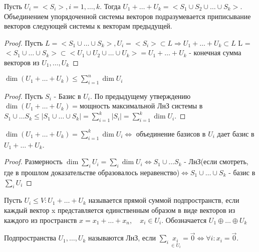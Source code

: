 \begin{proposition}
	Пусть \(U_i = <S_i>, i = 1,\ldots, k\). Тогда \(U_1+\ldots + U_k = <S_1\cup S_2\cup\ldots\cup S_k>\). Объединением упорядоченной системы векторов подразумевается приписывание векторов следующей системы к векторам предыдущей.
\end{proposition}
\begin{proof}
	Пусть \(L = <S_1\cup \ldots\cup S_k>, U_i = <S_i>\subset L\Longrightarrow U_1 + \ldots + U_k\subset L\) \newline
	L = \(<S_1\cup\ldots\cup S_k>\subset <U_1\cup U_2 \cup \ldots\cup U_k> = U_1 + \ldots + U_k\) - конечная сумма векторов из \(U_1, \ldots, U_k\)
\end{proof}
\begin{proposition}
	\(\dim(U_1 + \ldots + U_k) \le \sum_{i=1}^{n}\dim U_i\)
\end{proposition}
\begin{proof}
	Пусть \(S_i\) - Базис в \(U_i\). По предыдущему утверждению \(\dim (U_1 + \ldots + U_k) =\)мощность максимальной ЛнЗ системы в \(S_1\cup \ldots S_k\le |S_1\cup\ldots\cup S_k|= \sum_{i=1}^{k}|S_i| = \sum_{i=1}^{k}\dim U_i\).
\end{proof}
\begin{corollary}
	\(\dim(U_1+\ldots + U_k) = \sum_{i=1}^{k}\dim U_i\Longleftrightarrow\) объединение базисов в \(U_i\) дает базис в \(U_1+\ldots+U_k\).
\end{corollary}
\begin{proof}
	Размерность \(\dim \sum_{i}U_i = \sum_{i}\dim U_i\Longleftrightarrow S_1\cup\ldots S_k\) - ЛнЗ(если смотреть, где в прошлом доказательстве образовалось неравенство)$\Longleftrightarrow S_1\cup\ldots\cup S_k$ - базис в $\sum_{i}U_i$
\end{proof}
\begin{definition}
	Пусть \(U_i\le V: U_1+\ldots+U_k\) называется прямой суммой подпространств, если каждый вектор x представляется единственным образом в виде векторов из каждого из пространств \(x = x_1+\ldots+x_n, \quad x_i\in U_i\). Обозначается \(U_1\oplus\ldots\oplus U_k\)
\end{definition}
\begin{definition}
	Подпространства \(U_1, \ldots, U_k\) называются ЛнЗ, если \(\sum_i\underset{\in U_i}{x_i}=\vec 0 \Longleftrightarrow \forall i: x_i = \vec 0\).
\end{definition}
